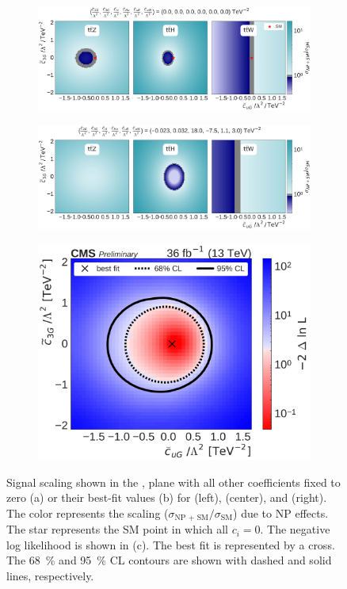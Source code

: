 \begin{figure}
  \vspace{-1cm}
  \begin{subfigure}{\linewidth}
    \centering
    \includegraphics[width=\linewidth]{figures/thirteen-TeV/scaling-frozen/cuG_tc3G}
    \caption{}
  \end{subfigure}
  \begin{subfigure}{\linewidth}
    \centering
    \includegraphics[width=\linewidth]{figures/thirteen-TeV/scaling/cuG_tc3G}
    \caption{}
  \end{subfigure}
  \begin{subfigure}{\linewidth}
    \centering
    \includegraphics[width=0.6\linewidth]{figures/thirteen-TeV/nll/cuG_tc3G}
    \caption{}
  \end{subfigure}
  \vspace{-1cm}
  \setlength{\capwidth}{15cm}
  \caption[Signal scaling and profile likelihood scan in the \cuG, \tcthreeG plane]{Signal scaling
  shown in the \cuG, \tcthreeG plane with all other coefficients fixed to zero (a) or their best-fit
  values (b) for \ttZ (left), \ttH (center), and \ttW (right). The color represents the scaling
  ($\sigma_\text{NP + SM} / \sigma_\text{SM}$) due to NP effects. The star represents the SM point in
  which all $c_i=0$. The negative log likelihood is shown in (c). The best fit is represented by a
  cross. The \SI{68}{\percent} and \SI{95}{\percent} CL contours are shown with dashed and solid
  lines, respectively.}
\end{figure}

